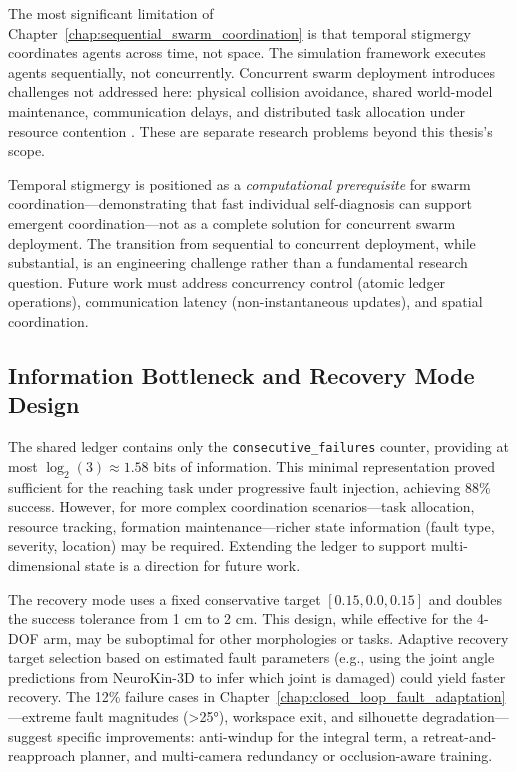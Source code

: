 \documentclass[12pt,a4paper,oneside]{report}
\begin{document}
The most significant limitation of Chapter~\ref{chap:sequential_swarm_coordination} is that temporal stigmergy coordinates agents across time, not space. The simulation framework executes agents sequentially, not concurrently. Concurrent swarm deployment introduces challenges not addressed here: physical collision avoidance, shared world-model maintenance, communication delays, and distributed task allocation under resource contention \cite{matsuki2024gaussian, keetha2024splattam}. These are separate research problems beyond this thesis's scope.

Temporal stigmergy is positioned as a \textit{computational prerequisite} for swarm coordination—demonstrating that fast individual self-diagnosis can support emergent coordination—not as a complete solution for concurrent swarm deployment. The transition from sequential to concurrent deployment, while substantial, is an engineering challenge rather than a fundamental research question. Future work must address concurrency control (atomic ledger operations), communication latency (non-instantaneous updates), and spatial coordination.

\subsection{Information Bottleneck and Recovery Mode Design}
\label{subsec:information_bottleneck_and_recovery_mode_design}

The shared ledger contains only the \texttt{consecutive\_failures} counter, providing at most $\log_2(3) \approx 1.58$ bits of information. This minimal representation proved sufficient for the reaching task under progressive fault injection, achieving 88\% success. However, for more complex coordination scenarios—task allocation, resource tracking, formation maintenance—richer state information (fault type, severity, location) may be required. Extending the ledger to support multi-dimensional state is a direction for future work.

The recovery mode uses a fixed conservative target $[0.15, 0.0, 0.15]$ and doubles the success tolerance from 1 cm to 2 cm. This design, while effective for the 4-DOF arm, may be suboptimal for other morphologies or tasks. Adaptive recovery target selection based on estimated fault parameters (e.g., using the joint angle predictions from NeuroKin-3D to infer which joint is damaged) could yield faster recovery. The 12\% failure cases in Chapter~\ref{chap:closed_loop_fault_adaptation}—extreme fault magnitudes (>25°), workspace exit, and silhouette degradation—suggest specific improvements: anti-windup for the integral term, a retreat-and-reapproach planner, and multi-camera redundancy or occlusion-aware training.
\end{document}
